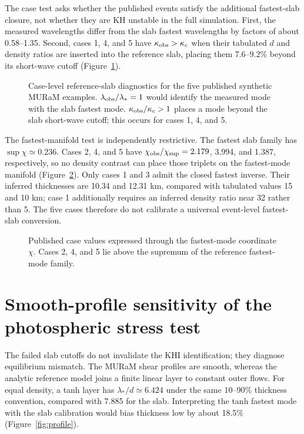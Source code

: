 \documentclass[linenumbers]{aastex7}
\begin{document}
The case test asks whether the published events satisfy the additional fastest-slab closure, not whether they are KH unstable in the full simulation. First, the measured wavelengths differ from the slab fastest wavelengths by factors of about 0.58--1.35. Second, cases 1, 4, and 5 have $\kappa_{\rm obs}>\kappa_c$ when their tabulated $d$ and density ratios are inserted into the reference slab, placing them 7.6--9.2\% beyond its short-wave cutoff (Figure~\ref{fig:mode-location}).

\begin{figure}
\caption{Case-level reference-slab diagnostics for the five published synthetic MURaM examples. $\lambda_{\rm obs}/\lambda_\ast=1$ would identify the measured mode with the slab fastest mode. $\kappa_{\rm obs}/\kappa_c>1$ places a mode beyond the slab short-wave cutoff; this occurs for cases 1, 4, and 5.}
\label{fig:mode-location}
\end{figure}

The fastest-manifold test is independently restrictive. The fastest slab family has $\sup\chi\simeq0.236$. Cases 2, 4, and 5 have $\chi_{\rm obs}/\chi_{\rm sup}=2.179$, 3.994, and 1.387, respectively, so no density contrast can place those triplets on the fastest-mode manifold (Figure~\ref{fig:chi-cases}). Only cases 1 and 3 admit the closed fastest inverse. Their inferred thicknesses are 10.34 and 12.31 km, compared with tabulated values 15 and 10 km; case 1 additionally requires an inferred density ratio near 32 rather than 5. The five cases therefore do not calibrate a universal event-level fastest-slab conversion.

\begin{figure}
\caption{Published case values expressed through the fastest-mode coordinate $\chi$. Cases 2, 4, and 5 lie above the supremum of the reference fastest-mode family.}
\label{fig:chi-cases}
\end{figure}

\section{Smooth-profile sensitivity of the photospheric stress test}
The failed slab cutoffs do not invalidate the KHI identification; they diagnose equilibrium mismatch. The MURaM shear profiles are smooth, whereas the analytic reference model joins a finite linear layer to constant outer flows. For equal density, a tanh layer has $\lambda_\ast/d\simeq6.424$ under the same 10--90\% thickness convention, compared with 7.885 for the slab. Interpreting the tanh fastest mode with the slab calibration would bias thickness low by about 18.5\% (Figure~\ref{fig:profile}).
\end{document}
